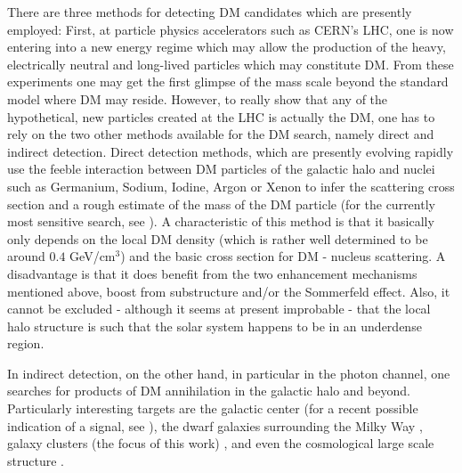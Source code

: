 \documentclass[10pt,aps,pra,reprint,amsmath,amsfonts,amssymb,showpacs,nofootinbib,floatfix]{revtex4-1}
\begin{document}
There are three methods for detecting DM candidates which are
presently employed: First, at particle physics accelerators such as
CERN's LHC, one is now entering into a new energy regime which may
allow the production of the heavy, electrically neutral and long-lived
particles which may constitute DM. From these experiments one may get
the first glimpse of the mass scale beyond the standard model where DM
may reside. However, to really show that any of the hypothetical, new
particles created at the LHC is actually the DM, one has to rely on
the two other methods available for the DM search, namely direct and
indirect detection. Direct detection methods, which are presently
evolving rapidly use the feeble interaction between DM particles of
the galactic halo and nuclei such as Germanium, Sodium, Iodine, Argon
or Xenon to infer the scattering cross section and a rough estimate of
the mass of the DM particle (for the currently most sensitive search,
see \cite{Aprile:2010um}). A characteristic of this method is that it
basically only depends on the local DM density (which is rather well
determined to be around $0.4$ GeV/cm$^3$) and the basic cross section
for DM - nucleus scattering. A disadvantage is that it does benefit
from the two enhancement mechanisms mentioned above, boost from
substructure and/or the Sommerfeld effect. Also, it cannot be excluded
- although it seems at present improbable - that the local halo
structure is such that the solar system happens to be in an underdense
region.

In indirect detection, on the other hand, in particular in the photon
channel, one searches for products of DM annihilation in the galactic
halo and beyond. Particularly interesting targets are the galactic
center (for a recent possible indication of a signal, see
\cite{Hooper:2010mq}), the dwarf galaxies surrounding the Milky Way
\cite{Strigari:2006rd,Essig:2009jx,2010JCAP...01..031S}, galaxy
clusters (the focus of this work)
\cite{Ghigna:1998vn,Lewis:2002mfa,Boyarsky:2006kc,2006A&A...455...21C,2009PhRvL.103r1302P},
and even the cosmological large scale structure
\cite{Bergstrom:2001jj,Ullio:2002pj,Taylor:2002zd,Elsaesser:2004ap,Cuoco:2010jb,Abazajian:2010sq,Abdo:2010dk,Zavala:2011tt}.
\end{document}

